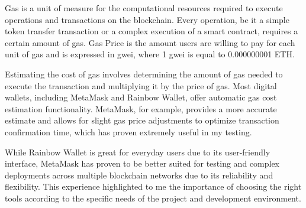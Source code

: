Gas is a unit of measure for the computational resources required to execute operations and transactions on the blockchain. Every operation, be it a simple token transfer transaction or a complex execution of a smart contract, requires a certain amount of gas. Gas Price is the amount users are willing to pay for each unit of gas and is expressed in gwei, where 1 gwei is equal to 0.000000001 ETH.

Estimating the cost of gas involves determining the amount of gas needed to execute the transaction and multiplying it by the price of gas. Most digital wallets, including MetaMask and Rainbow Wallet, offer automatic gas cost estimation functionality. MetaMask, for example, provides a more accurate estimate and allows for slight gas price adjustments to optimize transaction confirmation time, which has proven extremely useful in my testing.

While Rainbow Wallet is great for everyday users due to its user-friendly interface, MetaMask has proven to be better suited for testing and complex deployments across multiple blockchain networks due to its reliability and flexibility. This experience highlighted to me the importance of choosing the right tools according to the specific needs of the project and development environment.